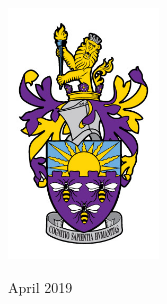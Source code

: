 \begin{titlepage}
	\includegraphics[width=0.3\textwidth]{images/crest.jpg}

    \vfill
    
	{\large April 2019} %

\end{titlepage}